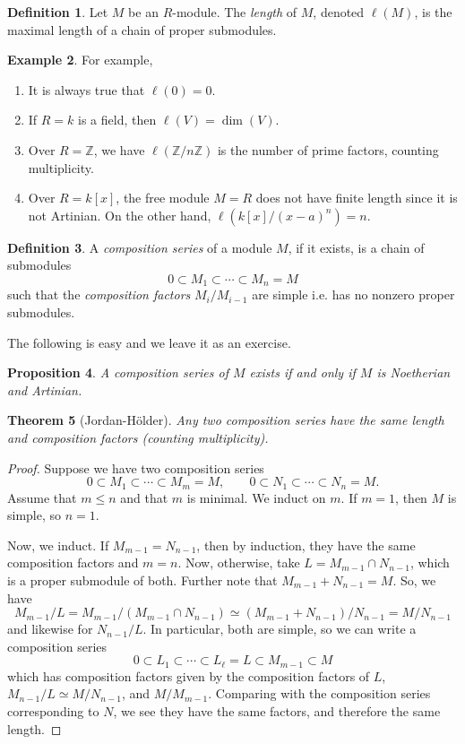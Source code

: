 \documentclass[10pt]{article}
\newtheorem{thm}{Theorem}[section]
\newtheorem{prop}[thm]{Proposition}
\theoremstyle{definition}
\newtheorem{exmp}[thm]{Example}
\newtheorem{defn}[thm]{Definition}
\newcommand{\Z}{\mathbb{Z}}
\begin{document}
\begin{defn}
Let $M$ be an $R$-module.  The \emph{length} of $M$, denoted $\ell(M)$, is the maximal length of a chain of proper submodules.
\end{defn}

\begin{exmp}
For example,
\begin{enumerate}
\item It is always true that $\ell(0) = 0$.
\item If $R = k$ is a field, then $\ell(V) = \dim(V)$.
\item Over $R = \Z$, we have $\ell(\Z/n\Z)$ is the number of prime factors, counting multiplicity.
\item Over $R = k[x]$, the free module $M = R$ does not have finite length since it is not Artinian.  On the other hand, $\ell(k[x]/(x-a)^n) = n$.
\end{enumerate}
\end{exmp}

\begin{defn}
A \emph{composition series} of a module $M$, if it exists, is a chain of submodules
$$0 \subset M_1 \subset \cdots \subset M_n = M$$
such that the \emph{composition factors} $M_i/M_{i-1}$ are simple i.e. has no nonzero proper submodules.
\end{defn}

The following is easy and we leave it as an exercise.
\begin{prop}
A composition series of $M$ exists if and only if $M$ is Noetherian and Artinian.
\end{prop}

\begin{thm}[Jordan-H\"{o}lder]
Any two composition series have the same length and composition factors (counting multiplicity).
\end{thm}
\begin{proof}
Suppose we have two composition series
$$0 \subset M_1 \subset \cdots \subset M_m = M, \;\;\;\;\;\;\; 0 \subset N_1 \subset \cdots \subset N_n = M.$$
Assume that $m \leq n$ and that $m$ is minimal.  We induct on $m$.  If $m = 1$, then $M$ is simple, so $n = 1$.

Now, we induct.  If $M_{m-1} = N_{n-1}$, then by induction, they have the same composition factors and $m=n$.  Now, otherwise, take $L = M_{m-1} \cap N_{n-1}$, which is a proper submodule of both.  Further note that $M_{m-1} + N_{n-1} = M$.    So, we have
$$M_{m-1}/L = M_{m-1}/(M_{m-1} \cap N_{n-1}) \simeq (M_{m-1} + N_{n-1})/N_{n-1}  = M/N_{n-1}$$
and likewise for $N_{n-1}/L$.  In particular, both are simple, so we can write a composition series
$$0 \subset L_1 \subset \cdots \subset L_\ell =L \subset M_{m-1} \subset M$$
which has composition factors given by the composition factors of $L$, $M_{n-1}/L \simeq M/N_{n-1}$, and $M/M_{m-1}$.  Comparing with the composition series corresponding to $N$, we see they have the same factors, and therefore the same length.
\end{proof}
\end{document}
